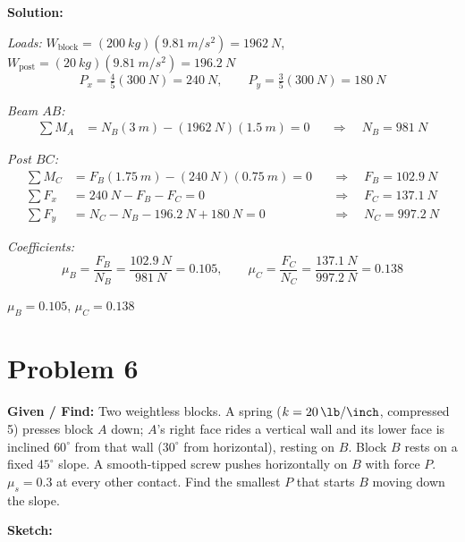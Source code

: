 \documentclass[11pt]{article}
\newcommand{\problem}[1]{\clearpage\section*{Problem #1}}
\begin{document}
\textbf{Solution:}

\textit{Loads:} $W_{\text{block}} = (\SI{200}{kg})(\SI{9.81}{m/s^2}) = \SI{1962}{N}$, $W_{\text{post}} = (\SI{20}{kg})(\SI{9.81}{m/s^2}) = \SI{196.2}{N}$
\[
    P_x = \tfrac{4}{5}(\SI{300}{N}) = \SI{240}{N}, \qquad P_y = \tfrac{3}{5}(\SI{300}{N}) = \SI{180}{N}
\]

\textit{Beam $AB$:}
\begin{align*}
    \sum M_A &= N_B(\SI{3}{m}) - (\SI{1962}{N})(\SI{1.5}{m}) = 0 &&\Rightarrow\quad N_B = \SI{981}{N}
\end{align*}

\textit{Post $BC$:}
\begin{align*}
    \sum M_C &= F_B(\SI{1.75}{m}) - (\SI{240}{N})(\SI{0.75}{m}) = 0 &&\Rightarrow\quad F_B = \SI{102.9}{N} \\
    \sum F_x &= \SI{240}{N} - F_B - F_C = 0 &&\Rightarrow\quad F_C = \SI{137.1}{N} \\
    \sum F_y &= N_C - N_B - \SI{196.2}{N} + \SI{180}{N} = 0 &&\Rightarrow\quad N_C = \SI{997.2}{N}
\end{align*}

\textit{Coefficients:}
\[
    \mu_B = \frac{F_B}{N_B} = \frac{\SI{102.9}{N}}{\SI{981}{N}} = 0.105, \qquad
    \mu_C = \frac{F_C}{N_C} = \frac{\SI{137.1}{N}}{\SI{997.2}{N}} = 0.138
\]

\begin{finalanswer}
    $\mu_B = 0.105$, \qquad $\mu_C = 0.138$
\end{finalanswer}

\problem{6}

\textbf{Given / Find:} Two weightless blocks. A spring ($k = \SI{20}{\lb/\inch}$, compressed \SI{5}{\inch}) presses block $A$ down; $A$'s right face rides a vertical wall and its lower face is inclined $60^\circ$ from that wall ($30^\circ$ from horizontal), resting on $B$. Block $B$ rests on a fixed $45^\circ$ slope. A smooth-tipped screw pushes horizontally on $B$ with force $P$. $\mu_s = 0.3$ at every other contact. Find the smallest $P$ that starts $B$ moving down the slope.

\textbf{Sketch:}
\end{document}
